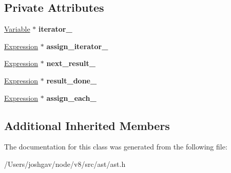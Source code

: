 \subsection*{Private Attributes}
\begin{DoxyCompactItemize}
\item 
\hyperlink{classv8_1_1internal_1_1_variable}{Variable} $\ast$ {\bfseries iterator\+\_\+}\hypertarget{classv8_1_1internal_1_1_for_of_statement_a802207ae75584f18d8ece743d1c1545b}{}\label{classv8_1_1internal_1_1_for_of_statement_a802207ae75584f18d8ece743d1c1545b}

\item 
\hyperlink{classv8_1_1internal_1_1_expression}{Expression} $\ast$ {\bfseries assign\+\_\+iterator\+\_\+}\hypertarget{classv8_1_1internal_1_1_for_of_statement_adc96a8f213c106c34c122404faceec60}{}\label{classv8_1_1internal_1_1_for_of_statement_adc96a8f213c106c34c122404faceec60}

\item 
\hyperlink{classv8_1_1internal_1_1_expression}{Expression} $\ast$ {\bfseries next\+\_\+result\+\_\+}\hypertarget{classv8_1_1internal_1_1_for_of_statement_a70a9858b71bd36c88757043ef8bcfaf9}{}\label{classv8_1_1internal_1_1_for_of_statement_a70a9858b71bd36c88757043ef8bcfaf9}

\item 
\hyperlink{classv8_1_1internal_1_1_expression}{Expression} $\ast$ {\bfseries result\+\_\+done\+\_\+}\hypertarget{classv8_1_1internal_1_1_for_of_statement_a391ff8f9586918c0b05c1eacc05b2c31}{}\label{classv8_1_1internal_1_1_for_of_statement_a391ff8f9586918c0b05c1eacc05b2c31}

\item 
\hyperlink{classv8_1_1internal_1_1_expression}{Expression} $\ast$ {\bfseries assign\+\_\+each\+\_\+}\hypertarget{classv8_1_1internal_1_1_for_of_statement_a671aa09b92d20cf4553529b35be394c1}{}\label{classv8_1_1internal_1_1_for_of_statement_a671aa09b92d20cf4553529b35be394c1}

\end{DoxyCompactItemize}
\subsection*{Additional Inherited Members}


The documentation for this class was generated from the following file\+:\begin{DoxyCompactItemize}
\item 
/\+Users/joshgav/node/v8/src/ast/ast.\+h\end{DoxyCompactItemize}
